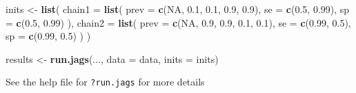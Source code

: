 \documentclass[
  ignorenonframetext,
]{beamer}
\newenvironment{Shaded}{\begin{snugshade}}{\end{snugshade}}
\newcommand{\AttributeTok}[1]{\textcolor[rgb]{0.13,0.29,0.53}{#1}}
\newcommand{\ConstantTok}[1]{\textcolor[rgb]{0.56,0.35,0.01}{#1}}
\newcommand{\FloatTok}[1]{\textcolor[rgb]{0.00,0.00,0.81}{#1}}
\newcommand{\FunctionTok}[1]{\textcolor[rgb]{0.13,0.29,0.53}{\textbf{#1}}}
\newcommand{\NormalTok}[1]{#1}
\newcommand{\OtherTok}[1]{\textcolor[rgb]{0.56,0.35,0.01}{#1}}
\begin{document}
\begin{frame}[fragile]
\scriptsize

\begin{Shaded}
\begin{Highlighting}[]
\NormalTok{inits }\OtherTok{\textless{}{-}} \FunctionTok{list}\NormalTok{(}
  \AttributeTok{chain1 =} \FunctionTok{list}\NormalTok{(}
    \AttributeTok{prev =} \FunctionTok{c}\NormalTok{(}\ConstantTok{NA}\NormalTok{, }\FloatTok{0.1}\NormalTok{, }\FloatTok{0.1}\NormalTok{, }\FloatTok{0.9}\NormalTok{, }\FloatTok{0.9}\NormalTok{),}
    \AttributeTok{se =} \FunctionTok{c}\NormalTok{(}\FloatTok{0.5}\NormalTok{, }\FloatTok{0.99}\NormalTok{),}
    \AttributeTok{sp =} \FunctionTok{c}\NormalTok{(}\FloatTok{0.5}\NormalTok{, }\FloatTok{0.99}\NormalTok{)}
\NormalTok{  ),}
  \AttributeTok{chain2 =} \FunctionTok{list}\NormalTok{(}
    \AttributeTok{prev =} \FunctionTok{c}\NormalTok{(}\ConstantTok{NA}\NormalTok{, }\FloatTok{0.9}\NormalTok{, }\FloatTok{0.9}\NormalTok{, }\FloatTok{0.1}\NormalTok{, }\FloatTok{0.1}\NormalTok{),}
    \AttributeTok{se =} \FunctionTok{c}\NormalTok{(}\FloatTok{0.99}\NormalTok{, }\FloatTok{0.5}\NormalTok{),}
    \AttributeTok{sp =} \FunctionTok{c}\NormalTok{(}\FloatTok{0.99}\NormalTok{, }\FloatTok{0.5}\NormalTok{)}
\NormalTok{  )}
\NormalTok{)}

\NormalTok{results }\OtherTok{\textless{}{-}} \FunctionTok{run.jags}\NormalTok{(..., }\AttributeTok{data =}\NormalTok{ data, }\AttributeTok{inits =}\NormalTok{ inits)}
\end{Highlighting}
\end{Shaded}

\normalsize
\end{frame}

\begin{frame}[fragile]
See the help file for \texttt{?run.jags} for more details
\end{frame}
\end{document}
